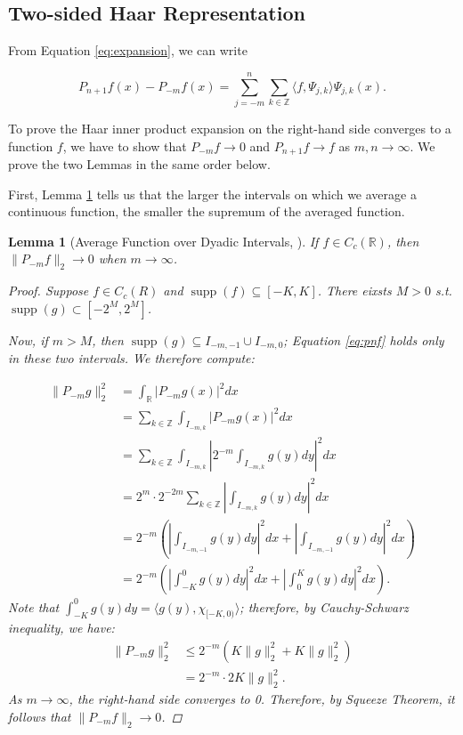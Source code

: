\documentclass[11pt]{amsart}
\theoremstyle{theorem} %
\newtheorem{lem}[thm]{Lemma} %
\theoremstyle{definition}
\theoremstyle{example}
\theoremstyle{remark}
\numberwithin{equation}{section}
\newcommand{\R}{\mathbb{R}}
\newcommand{\Z}{\mathbb{Z}}
\DeclareMathOperator*{\supp}{supp}
\begin{document}
\subsection{Two-sided Haar Representation}
From Equation \ref{eq:expansion}, we can write

\begin{equation} \label{eq:twosided}
	P_{n+1}f(x) - P_{-m}f(x) = \sum_{j=-m}^{n} \sum_{k \in \Z} \langle f, \varPsi_{j,k} \rangle \varPsi_{j,k}(x).
\end{equation}

To prove the Haar inner product expansion on the right-hand side converges to a function $ f $, we have to show that $ P_{-m}f \to 0 $ and  $ P_{n+1}f \to f $ as $ m, n \to \infty $. We prove the two Lemmas in the same order below.

\vspace{8pt}
First, Lemma \ref{lem:average} tells us that the larger the intervals on which we average a continuous function, the smaller the supremum of the averaged function.

\begin{lem}[Average Function over Dyadic Intervals, {\cite[295]{pinsky}}] \label{lem:average}
	If $ f \in C_c(\R) $, then $ \|P_{-m}f\|_2 \to 0 $ when $ m \to \infty $.
	
	\begin{proof}
		Suppose $ f \in C_c(R) $ and $ \supp(f) \subseteq [-K,K] $. There eixsts $ M > 0 $ s.t. $ \supp(g) \subset [-2^M, 2^M] $.
		
		Now, if $ m > M $, then $ \supp(g) \subseteq I_{-m,-1} \cup I_{-m,0} $; Equation \ref{eq:pnf} holds only in these two intervals.
		We therefore compute:
		
		\begin{align*}
			\| P_{-m}g \|_2^2 &= \int_{\R} \left| P_{-m}g(x) \right|^2 dx \\
			&= \sum_{k \in \Z} \int_{I_{-m,k}} |P_{-m}g(x)|^2 dx \\
			&= \sum_{k \in \Z} \int_{I_{-m,k}} \left|2^{-m} \int_{I_{-m,k}} g(y) dy \right|^2 dx \\
			&= 2^{m} \cdot 2^{-2m} \sum_{k \in \Z} \left|\int_{I_{-m,k}} g(y) dy \right|^2 dx \\
			&= 2^{-m} \left( \left|\int_{I_{-m,-1}} g(y) dy \right|^2 dx + \left| \int_{I_{-m,-1}} g(y) dy \right|^2 dx \right) \\
			&=  2^{-m} \left( \left|\int_{-K}^0 g(y) dy \right|^2 dx + \left| \int_{0}^K g(y) dy \right|^2 dx \right).
		\end{align*}
		Note that $ \int_{-K}^0 g(y) dy = \langle g(y),\chi_{[-K,0)}  \rangle $; therefore, by Cauchy-Schwarz inequality, we have:
		\begin{align*}
		\| P_{-m}g \|_2^2	&\leq  2^{-m} \left( K \|g\|_2^2 + K \|g\|_2^2 \right) \\
			&= 2^{-m} \cdot 2K \|g\|_2^2.
		\end{align*}
		As $ m \to \infty $, the right-hand side converges to 0. Therefore, by Squeeze Theorem, it follows that $ \|P_{-m}f\|_2 \to 0 $.
	\end{proof}
\end{lem}
\end{document}
